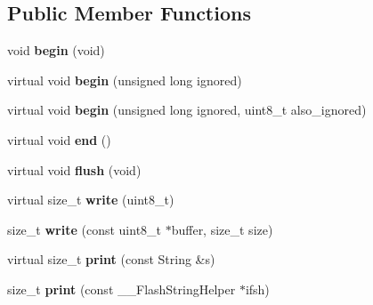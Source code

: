 \subsection*{Public Member Functions}
\begin{DoxyCompactItemize}
\item 
\hypertarget{class_bean_serial_transport_a092cfa3c87260632e9159a03f7bae9b7}{}void {\bfseries begin} (void)\label{class_bean_serial_transport_a092cfa3c87260632e9159a03f7bae9b7}

\item 
\hypertarget{class_bean_serial_transport_a553869ebe29160108d8d231c8541d322}{}virtual void {\bfseries begin} (unsigned long ignored)\label{class_bean_serial_transport_a553869ebe29160108d8d231c8541d322}

\item 
\hypertarget{class_bean_serial_transport_a9b64ff601e9ed03e13aa6da9b665dd32}{}virtual void {\bfseries begin} (unsigned long ignored, uint8\+\_\+t also\+\_\+ignored)\label{class_bean_serial_transport_a9b64ff601e9ed03e13aa6da9b665dd32}

\item 
\hypertarget{class_bean_serial_transport_ae6655a1138b1c7ba53c9f61ac96dcfbd}{}virtual void {\bfseries end} ()\label{class_bean_serial_transport_ae6655a1138b1c7ba53c9f61ac96dcfbd}

\item 
\hypertarget{class_bean_serial_transport_a8fc8dacac32043d3bcc74061772d8f3b}{}virtual void {\bfseries flush} (void)\label{class_bean_serial_transport_a8fc8dacac32043d3bcc74061772d8f3b}

\item 
\hypertarget{class_bean_serial_transport_a6c61d5e0a1819e2446c33587a798856f}{}virtual size\+\_\+t {\bfseries write} (uint8\+\_\+t)\label{class_bean_serial_transport_a6c61d5e0a1819e2446c33587a798856f}

\item 
\hypertarget{class_bean_serial_transport_a2c66260d2fb38c14e0dff13a7279d373}{}size\+\_\+t {\bfseries write} (const uint8\+\_\+t $\ast$buffer, size\+\_\+t size)\label{class_bean_serial_transport_a2c66260d2fb38c14e0dff13a7279d373}

\item 
\hypertarget{class_bean_serial_transport_a333e6f2c115c4959e9cd29760593f1cd}{}virtual size\+\_\+t {\bfseries print} (const String \&s)\label{class_bean_serial_transport_a333e6f2c115c4959e9cd29760593f1cd}

\item 
\hypertarget{class_bean_serial_transport_a9ab23521da395d86f33709a75dd63877}{}size\+\_\+t {\bfseries print} (const \+\_\+\+\_\+\+Flash\+String\+Helper $\ast$ifsh)\label{class_bean_serial_transport_a9ab23521da395d86f33709a75dd63877}


\end{DoxyCompactItemize}
